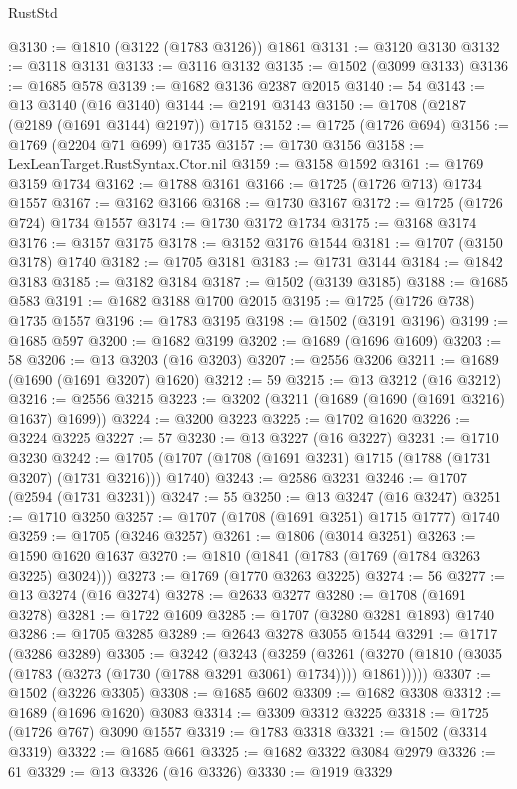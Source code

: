 \begin{lexlean}{RustStd}
\begin{coremodule}
@3130 := @1810 (@3122 (@1783 @3126)) @1861
@3131 := @3120 @3130
@3132 := @3118 @3131
@3133 := @3116 @3132
@3135 := @1502 (@3099 @3133)
@3136 := @1685 @578
@3139 := @1682 @3136 @2387 @2015
@3140 := 54
@3143 := @13 @3140 (@16 @3140)
@3144 := @2191 @3143
@3150 := @1708 (@2187 (@2189 (@1691 @3144) @2197)) @1715
@3152 := @1725 (@1726 @694)
@3156 := @1769 (@2204 @71 @699) @1735
@3157 := @1730 @3156
@3158 := LexLeanTarget.RustSyntax.Ctor.nil
@3159 := @3158 @1592
@3161 := @1769 @3159 @1734
@3162 := @1788 @3161
@3166 := @1725 (@1726 @713) @1734 @1557
@3167 := @3162 @3166
@3168 := @1730 @3167
@3172 := @1725 (@1726 @724) @1734 @1557
@3174 := @1730 @3172 @1734
@3175 := @3168 @3174
@3176 := @3157 @3175
@3178 := @3152 @3176 @1544
@3181 := @1707 (@3150 @3178) @1740
@3182 := @1705 @3181
@3183 := @1731 @3144
@3184 := @1842 @3183
@3185 := @3182 @3184
@3187 := @1502 (@3139 @3185)
@3188 := @1685 @583
@3191 := @1682 @3188 @1700 @2015
@3195 := @1725 (@1726 @738) @1735 @1557
@3196 := @1783 @3195
@3198 := @1502 (@3191 @3196)
@3199 := @1685 @597
@3200 := @1682 @3199
@3202 := @1689 (@1696 @1609)
@3203 := 58
@3206 := @13 @3203 (@16 @3203)
@3207 := @2556 @3206
@3211 := @1689 (@1690 (@1691 @3207) @1620)
@3212 := 59
@3215 := @13 @3212 (@16 @3212)
@3216 := @2556 @3215
@3223 := @3202 (@3211 (@1689 (@1690 (@1691 @3216) @1637) @1699))
@3224 := @3200 @3223
@3225 := @1702 @1620
@3226 := @3224 @3225
@3227 := 57
@3230 := @13 @3227 (@16 @3227)
@3231 := @1710 @3230
@3242 := @1705 (@1707 (@1708 (@1691 @3231) @1715 (@1788 (@1731 @3207) (@1731 @3216))) @1740)
@3243 := @2586 @3231
@3246 := @1707 (@2594 (@1731 @3231))
@3247 := 55
@3250 := @13 @3247 (@16 @3247)
@3251 := @1710 @3250
@3257 := @1707 (@1708 (@1691 @3251) @1715 @1777) @1740
@3259 := @1705 (@3246 @3257)
@3261 := @1806 (@3014 @3251)
@3263 := @1590 @1620 @1637
@3270 := @1810 (@1841 (@1783 (@1769 (@1784 @3263 @3225) @3024)))
@3273 := @1769 (@1770 @3263 @3225)
@3274 := 56
@3277 := @13 @3274 (@16 @3274)
@3278 := @2633 @3277
@3280 := @1708 (@1691 @3278)
@3281 := @1722 @1609
@3285 := @1707 (@3280 @3281 @1893) @1740
@3286 := @1705 @3285
@3289 := @2643 @3278 @3055 @1544
@3291 := @1717 (@3286 @3289)
@3305 := @3242
    (@3243
      (@3259
        (@3261 (@3270 (@1810 (@3035 (@1783 (@3273 (@1730 (@1788 @3291 @3061) @1734)))) @1861)))))
@3307 := @1502 (@3226 @3305)
@3308 := @1685 @602
@3309 := @1682 @3308
@3312 := @1689 (@1696 @1620) @3083
@3314 := @3309 @3312 @3225
@3318 := @1725 (@1726 @767) @3090 @1557
@3319 := @1783 @3318
@3321 := @1502 (@3314 @3319)
@3322 := @1685 @661
@3325 := @1682 @3322 @3084 @2979
@3326 := 61
@3329 := @13 @3326 (@16 @3326)
@3330 := @1919 @3329

\end{coremodule}
\end{lexlean}

